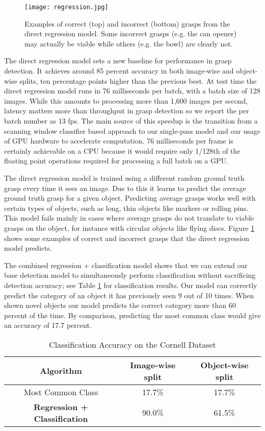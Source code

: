 \documentclass[letterpaper, 10 pt, conference]{ieeeconf}
\begin{document}
   \begin{figure}[tb]
      \centering
        \texttt{[image: regression.jpg]}
      \caption{Examples of correct (top) and incorrect (bottom) grasps from the direct regression model. Some incorrect grasps (e.g. the can opener) may actually be viable while others (e.g. the bowl) are clearly not.}
      \label{regression}
   \end{figure}

The direct regression model sets a new baseline for performance in grasp detection. It achieves around 85 percent accuracy in both image-wise and object-wise splits, ten percentage points higher than the previous best. At test time the direct regression model runs in 76 milliseconds per batch, with a batch size of 128 images. While this amounts to processing more than 1,600 images per second, latency matters more than throughput in grasp detection so we report the per batch number as 13 fps. The main source of this speedup is the transition from a scanning window classifier based approach to our single-pass model and our usage of GPU hardware to accelerate computation. 76 milliseconds per frame is certainly achievable on a CPU because it would require only 1/128th of the floating point operations required for processing a full batch on a GPU.

The direct regression model is trained using a different random ground truth grasp every time it sees an image. Due to this it learns to predict the average ground truth grasp for a given object. Predicting average grasps works well with certain types of objects, such as long, thin objects like markers or rolling pins. This model fails mainly in cases where average grasps do not translate to viable grasps on the object, for instance with circular objects like flying discs. Figure \ref{regression} shows some examples of correct and incorrect grasps that the direct regression model predicts.

The combined regression + classification model shows that we can extend our base detection model to simultaneously perform classification without sacrificing detection accuracy; see Table \ref{class} for classification results. Our model can correctly predict the category of an object it has previously seen 9 out of 10 times. When shown novel objects our model predicts the correct category more than 60 percent of the time. By comparison, predicting the most common class would give an accuracy of 17.7 percent.

\begin{table}[htbp]
\caption{Classification Accuracy on the Cornell Dataset}
\label{class}
\begin{center}
\begin{tabular}{|c|c|c|}
\hline
\textbf{Algorithm} & \textbf{Image-wise split} & \textbf{Object-wise split} \\
\hline
\hline
Most Common Class & 17.7\% & 17.7\%\\
\hline
\textbf{Regression + Classification} & 90.0\% & 61.5\% \\
\hline
\end{tabular}
\end{center}
\end{table}
\end{document}
